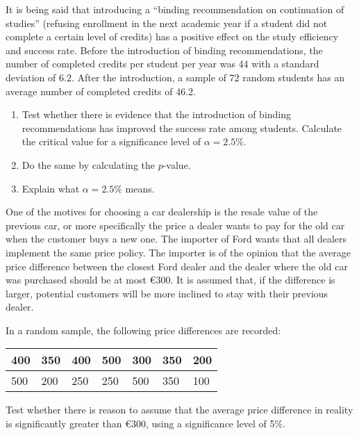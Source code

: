 \begin{exercise}
  \label{ex:binding-recommendation}
  
  It is being said that introducing a ``binding recommendation on continuation of studies'' (refusing enrollment in the next academic year if a student did not complete a certain level of credits) has a positive effect on the study efficiency and success rate. Before the introduction of binding recommendations, the number of completed credits per student per year was 44 with a standard deviation of 6.2. After the introduction, a sample of 72 random students has an average number of completed credits of 46.2.
  
  \begin{enumerate}
    \item Test whether there is evidence that the introduction of binding recommendations has improved the success rate among students. Calculate the critical value for a significance level of $\alpha = 2.5\%$.
    \item Do the same by calculating the $p$-value.
    \item Explain what $\alpha = 2.5 \%$ means.
  \end{enumerate}
\end{exercise}

\begin{exercise}
  \label{ex:price-difference-cars}
  
  One of the motives for choosing a car dealership is the resale value of the previous car, or more specifically the price a dealer wants to pay for the old car when the customer buys a new one. The importer of Ford wants that all dealers implement the same price policy. The importer is of the opinion that the average price difference between the closest Ford dealer and the dealer where the old car was purchased should be at most \euro{300}. It is assumed that, if the difference is larger, potential customers will be more inclined to stay with their previous dealer.
  
  In a random sample, the following price differences are recorded:
  
  \begin{center}
    \begin{tabular}{|l|l|l|l|l|l|l|}
      \hline
      400 & 350 & 400 & 500 & 300 & 350 & 200 \\ \hline
      500 & 200 & 250 & 250 & 500 & 350 & 100 \\ \hline
    \end{tabular}
  \end{center}

  Test whether there is reason to assume that the average price difference in reality is significantly greater than \euro{300}, using a significance level of 5\%.
  
\end{exercise}

